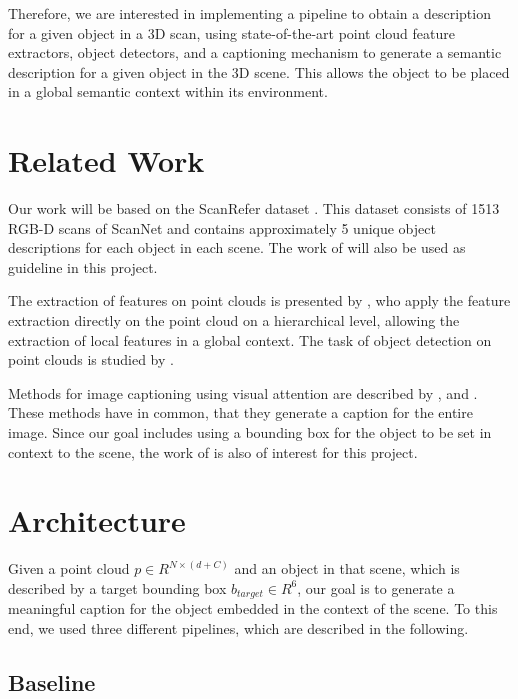 \documentclass[10pt,twocolumn,letterpaper]{article}
\begin{document}
Therefore, we are interested in implementing a pipeline to obtain a description for a given object in a 3D scan, using state-of-the-art point cloud feature extractors, object detectors, and a captioning mechanism to generate a semantic description for a given object in the 3D scene. This allows the object to be placed in a global semantic context within its environment.
 
\section{Related Work}
Our work will be based on the ScanRefer dataset \cite{chen2019scanrefer}. This dataset consists of 1513 RGB-D scans of ScanNet \cite{dai2017scannet} and contains approximately 5 unique object descriptions for each object in each scene. The work of \cite{chen2019scanrefer} will also be used as guideline in this project.

The extraction of features on point clouds is presented by \cite{qi2017pointnet++}, who apply the feature extraction directly on the point cloud on a hierarchical level, allowing the extraction of local features in a global context. 
The task of object detection on point clouds is studied by \cite{qi2019deep}. 

Methods for image captioning using visual attention are described by \cite{xu2015show}, \cite{lu2017knowing} and \cite{anderson2018bottom}.
These methods have in common, that they generate a caption for the entire image.
Since our goal includes using a bounding box for the object to be set in context to the scene, the work of \cite{rohrbach2016grounding} is also of interest for this project. 

\section{Architecture}

Given a point cloud $\mathit{p \in R^{N\times(d+C)}}$ and an object in that scene, which is described by a target bounding box $b_{target}\in R^6$, our goal is to generate a meaningful caption for the object embedded in the context of the scene. To this end, we used three different pipelines, which are described in the following.

\subsection{Baseline}
\end{document}
